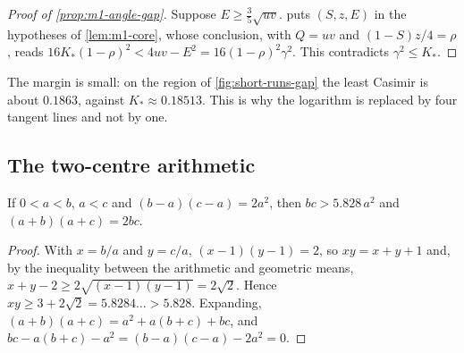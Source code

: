 \begin{proof}[Proof of \cref{prop:m1-angle-gap}]
  Suppose $E\ge\frac35\sqrt{uv}$.  puts $(S,z,E)$ in the hypotheses of
  \cref{lem:m1-core}, whose conclusion, with $Q=uv$ and $(1-S)z/4=\rho$, reads
  $16K_*(1-\rho)^2<4uv-E^2=16(1-\rho)^2\gamma^2$. This contradicts $\gamma^2\le K_*$.
\end{proof}

The margin is small: on the region of \cref{fig:short-runs-gap} the least Casimir is about
$0.1863$, against $K_*\approx0.18513$. This is why the logarithm is replaced by four tangent lines
and not by one.

\subsection{The two-centre arithmetic}

\begin{lemma}\label{lem:m1-bc}
  If $0<a<b$, $a<c$ and $(b-a)(c-a)=2a^2$, then $bc>5.828\,a^2$ and $(a+b)(a+c)=2bc$.
\end{lemma}

\begin{proof}
  With $x=b/a$ and $y=c/a$, $(x-1)(y-1)=2$, so $xy=x+y+1$ and, by the inequality between the
  arithmetic and geometric means, $x+y-2\ge2\sqrt{(x-1)(y-1)}=2\sqrt2$. Hence
  $xy\ge3+2\sqrt2=5.8284\ldots>5.828$. Expanding, $(a+b)(a+c)=a^2+a(b+c)+bc$, and
  $bc-a(b+c)-a^2=(b-a)(c-a)-2a^2=0$.
\end{proof}
